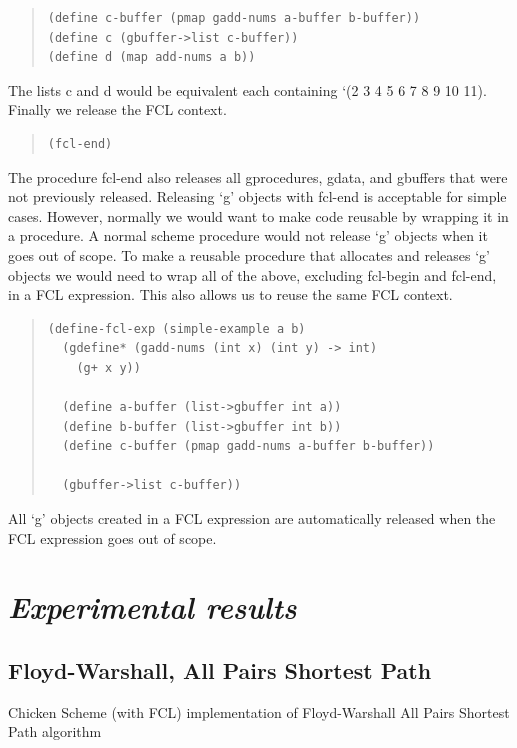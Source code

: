 \documentclass{article}
\begin{document}
{\begin{quote}
\begin{verbatim}
(define c-buffer (pmap gadd-nums a-buffer b-buffer))
(define c (gbuffer->list c-buffer))
(define d (map add-nums a b))
\end{verbatim}
\end{quote}

{\raggedright{}
The lists c and d would be equivalent each containing `(2 3 4 5 6 7 8 9 10 11).
Finally we release the FCL context.
}
\begin{quote}
\begin{verbatim}
(fcl-end)
\end{verbatim}
\end{quote}

{\raggedright{}
The procedure fcl-end also releases all gprocedures, gdata, and gbuffers that were not previously released.
Releasing `g' objects with fcl-end is acceptable for simple cases. However, normally we would want
 to make code reusable by wrapping it in a procedure.
A normal scheme procedure would not release `g' objects when it goes out of scope.
To make a reusable procedure that allocates and releases `g' objects we would need
to wrap all of the above, excluding fcl-begin and fcl-end, in a FCL expression. This
also allows us to reuse the same FCL context.
}

\begin{quote}
\begin{verbatim}
(define-fcl-exp (simple-example a b)
  (gdefine* (gadd-nums (int x) (int y) -> int)
    (g+ x y))

  (define a-buffer (list->gbuffer int a))
  (define b-buffer (list->gbuffer int b))
  (define c-buffer (pmap gadd-nums a-buffer b-buffer))

  (gbuffer->list c-buffer))
\end{verbatim}
\end{quote}

{\raggedright{}
All `g' objects created in a FCL expression are automatically released when the
 FCL expression goes out of scope.
}

\section{\emph{Experimental results}}

\subsection{Floyd-Warshall, All Pairs Shortest Path}
\raggedright{} {
Chicken Scheme (with FCL) implementation of Floyd-Warshall
All Pairs Shortest Path algorithm
}

}
\end{document}
